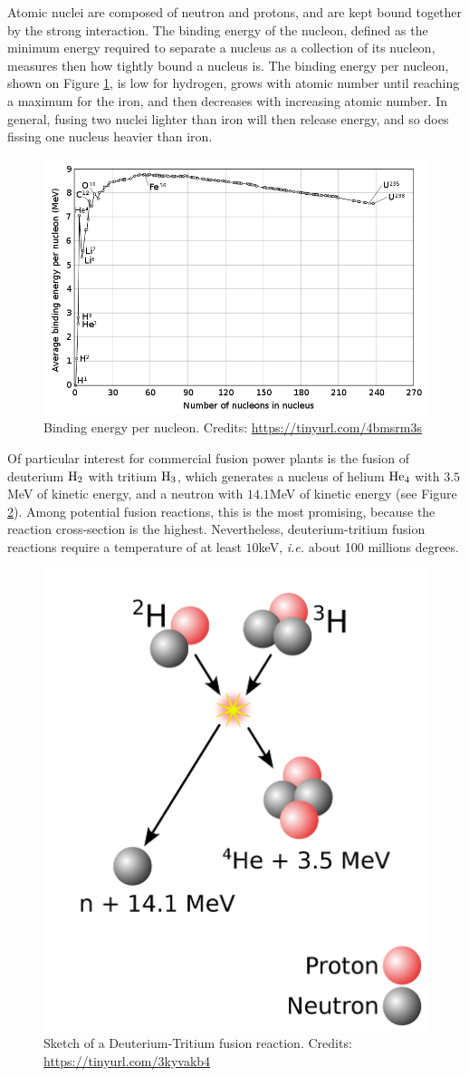 \documentclass[my_thesis.tex]{subfiles}
\begin{document}
Atomic nuclei are composed of neutron and protons, and are kept bound together by the strong interaction. The binding energy of the nucleon, defined as the minimum energy required to separate a nucleus as a collection of its nucleon, measures then how tightly bound a nucleus is. The binding energy per nucleon, shown on Figure \ref{fig. binding energy}, is low for hydrogen, grows with atomic number until reaching a maximum for the iron, and then decreases with increasing atomic number. In general, fusing two nuclei lighter than iron will then release energy, and so does fissing one nucleus heavier than iron.

\begin{figure}
    \centering
    \includegraphics[width=.75\linewidth]{images/Introduction/BindingEnergy.png}
    \caption{Binding energy per nucleon. Credits: \url{https://tinyurl.com/4bmsrm3s}}
    \label{fig. binding energy}
\end{figure}

Of particular interest for commercial fusion power plants is the fusion of deuterium $\ce{H2}$ with tritium $\ce{H3}$, which generates a nucleus of helium $\ce{He4}$ with $3.5$MeV of kinetic energy, and a neutron with $14.1$MeV of kinetic energy (see Figure \ref{fig. dt fusion}). Among potential fusion reactions, this is the most promising, because the reaction cross-section is the highest. Nevertheless, deuterium-tritium fusion reactions require a temperature of at least $10$keV, \textit{i.e.} about 100 millions degrees. 
\begin{figure}
    \centering
    \includegraphics[width=.5\linewidth]{images/Introduction/DTFusion.png}
    \caption{Sketch of a Deuterium-Tritium fusion reaction. Credits: \url{https://tinyurl.com/3kyvakb4}}
    \label{fig. dt fusion}
\end{figure}
\end{document}
